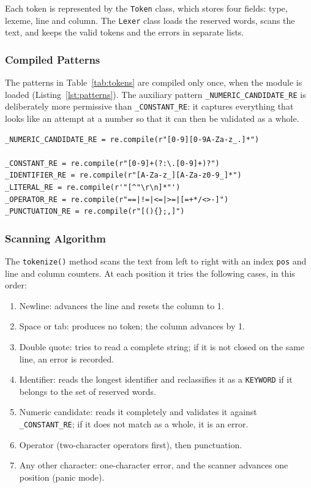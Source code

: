 \documentclass[11pt,letterpaper]{article}
\newcommand{\tok}[1]{\texttt{#1}}
\begin{document}
Each token is represented by the \tok{Token} class, which stores four fields:
type, lexeme, line and column. The \tok{Lexer} class loads the reserved words,
scans the text, and keeps the valid tokens and the errors in separate lists.

\subsubsection{Compiled Patterns}

The patterns in Table~\ref{tab:tokens} are compiled only once, when the module
is loaded (Listing~\ref{lst:patterns}). The auxiliary pattern
\tok{\_NUMERIC\_CANDIDATE\_RE} is deliberately more permissive than
\tok{\_CONSTANT\_RE}: it captures everything that looks like an attempt at a
number so that it can then be validated as a whole.

\par\noindent\begin{minipage}{\linewidth}
\begin{lstlisting}[style=pycode, caption={Compiled patterns in \tok{lexer.py}.}, label={lst:patterns}]
_NUMERIC_CANDIDATE_RE = re.compile(r"[0-9][0-9A-Za-z_.]*")

_CONSTANT_RE = re.compile(r"[0-9]+(?:\.[0-9]+)?")
_IDENTIFIER_RE = re.compile(r"[A-Za-z_][A-Za-z0-9_]*")
_LITERAL_RE = re.compile(r'"[^"\r\n]*"')
_OPERATOR_RE = re.compile(r"==|!=|<=|>=|[=+*/<>-]")
_PUNCTUATION_RE = re.compile(r"[(){};,]")
\end{lstlisting}
\end{minipage}\par\smallskip

\subsubsection{Scanning Algorithm}

The \tok{tokenize()} method scans the text from left to right with an index
\tok{pos} and line and column counters. At each position it tries the
following cases, in this order:

\begin{enumerate}[nosep]
  \item Newline: advances the line and resets the column to 1.
  \item Space or tab: produces no token; the column advances by 1.
  \item Double quote: tries to read a complete string; if it is not closed on
        the same line, an error is recorded.
  \item Identifier: reads the longest identifier and reclassifies it as a
        \tok{KEYWORD} if it belongs to the set of reserved words.
  \item Numeric candidate: reads it completely and validates it against
        \tok{\_CONSTANT\_RE}; if it does not match as a whole, it is an error.
  \item Operator (two-character operators first), then punctuation.
  \item Any other character: one-character error, and the scanner advances
        one position (panic mode).
\end{enumerate}
\end{document}
